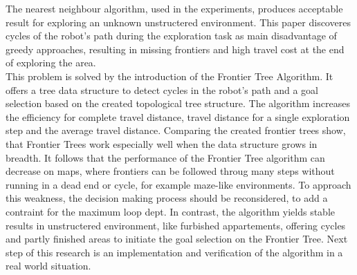 \documentclass[twocolumn]{svjour3}[2016]
\begin{document}
The nearest neighbour algorithm, used in the experiments, produces acceptable result for exploring an unknown unstructered environment. This paper discoveres cycles of the robot's path during the exploration task as main disadvantage of greedy approaches, resulting in missing frontiers and high travel cost at the end of exploring the area.\\
This problem is solved by the introduction of the Frontier Tree Algorithm. It offers a tree data structure to detect cycles in the robot's path and a goal selection based on the created topological tree structure. The algorithm increases the efficiency for complete travel distance, travel distance for a single exploration step and the average travel distance. Comparing the created frontier trees show, that Frontier Trees work especially well when the data structure grows in breadth. It follows that the performance of the Frontier Tree algorithm can decrease on maps, where frontiers can be followed throug many steps without running in a dead end or cycle, for example maze-like environments. To approach this weakness, the decision making process should be reconsidered, to add a contraint for the maximum loop dept. In contrast, the algorithm yields stable results in unstructered environment, like furbished appartements, offering cycles and partly finished areas to initiate the goal selection on the Frontier Tree. Next step of this research is an implementation and verification of the algorithm in a real world situation.



\end{document}
